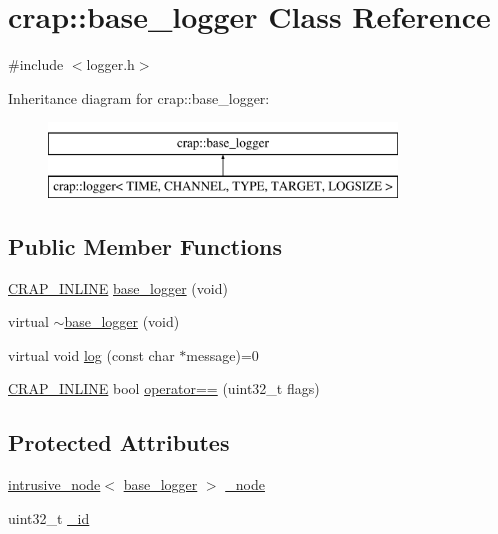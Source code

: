 \hypertarget{classcrap_1_1base__logger}{}\section{crap\+:\+:base\+\_\+logger Class Reference}
\label{classcrap_1_1base__logger}


{\ttfamily \#include $<$logger.\+h$>$}

Inheritance diagram for crap\+:\+:base\+\_\+logger\+:\begin{figure}[H]
\begin{center}
\leavevmode
\includegraphics[height=2.000000cm]{classcrap_1_1base__logger}
\end{center}
\end{figure}
\subsection*{Public Member Functions}
\begin{DoxyCompactItemize}
\item 
\hyperlink{config__x86_8h_a5a40526b8d842e7ff731509998bb0f1c}{C\+R\+A\+P\+\_\+\+I\+N\+L\+I\+N\+E} \hyperlink{classcrap_1_1base__logger_abd3c6e2087c45aff47a0dad949c285eb}{base\+\_\+logger} (void)
\item 
virtual \hyperlink{classcrap_1_1base__logger_ab73f1c441b19e3737485bd25dddce0cb}{$\sim$base\+\_\+logger} (void)
\item 
virtual void \hyperlink{classcrap_1_1base__logger_a8f6f23827baa21326be073e28c6b02e0}{log} (const char $\ast$message)=0
\item 
\hyperlink{config__x86_8h_a5a40526b8d842e7ff731509998bb0f1c}{C\+R\+A\+P\+\_\+\+I\+N\+L\+I\+N\+E} bool \hyperlink{classcrap_1_1base__logger_aec70fefb4adc6d6d3958f92fd7f292be}{operator==} (uint32\+\_\+t flags)
\end{DoxyCompactItemize}
\subsection*{Protected Attributes}
\begin{DoxyCompactItemize}
\item 
\hyperlink{classcrap_1_1intrusive__node}{intrusive\+\_\+node}$<$ \hyperlink{classcrap_1_1base__logger}{base\+\_\+logger} $>$ \hyperlink{classcrap_1_1base__logger_aa580a45655e76efb8e5c1dbe81ff4ed8}{\+\_\+node}
\item 
uint32\+\_\+t \hyperlink{classcrap_1_1base__logger_ae80fa04c0ba60e7a94586d3cc7634abb}{\+\_\+id}
\end{DoxyCompactItemize}


